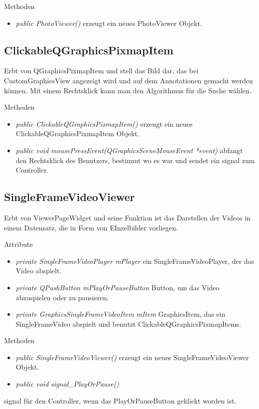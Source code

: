 Methoden
\begin{itemize}
	\item\textit{public PhotoViewer()} erzeugt ein neues PhotoViewer Objekt.
\end{itemize}

\subsection*{ClickableQGraphicsPixmapItem}
Erbt von QGraphicsPixmapItem und stell das Bild dar, das bei CustomGraphicsView angezeigt wird und auf dem Annotationen gemacht werden können. Mit einem Rechtsklick kann man den Algorithmus für die Suche wählen.

Methoden
\begin{itemize}
	\item\textit{public ClickableQGraphicsPixmapItem()} erzeugt ein neues ClickableQGraphicsPixmapItem Objekt.
	\item\textit{public void mousePressEvent(QGraphicsSceneMouseEvent *event)} abfangt den Rechtsklick des Benutzers, bestimmt wo es war und sendet ein signal zum Controller.
\end{itemize}

\subsection*{SingleFrameVideoViewer}
Erbt von ViewerPageWidget und seine Funktion ist das Darstellen der Videos in einem Datensatz, die in Form von EInzelbilder vorliegen.

Attribute
\begin{itemize}
	\item\textit{private SingleFrameVideoPlayer mPlayer} ein SingleFrameVideoPlayer, der das Video abspielt. 
	\item\textit{private QPushButton mPlayOrPauseButton} Button, um das Video abzuspielen oder zu pausieren.
	\item\textit{private GraphicsSingleFrameVideoItem mItem} GraphicsItem, das ein SingleFrameVideo abspielt und benutzt ClickableQGraphicsPixmapItems.
\end{itemize}

Methoden
\begin{itemize}
	\item\textit{public SingleFrameVideoViewer()} erzeugt ein neues SingleFrameVideoViewer Objekt.
	\item\textit{public void signal\_PlayOrPause()}
\end{itemize} signal für den Controller, wenn das PlayOrPauseButton geklickt worden ist. 

